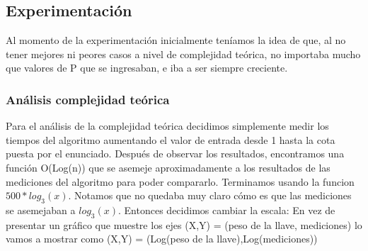 \documentclass[spanish,12pt]{article}
\begin{document}
{%



\subsection{Experimentación}
 Al momento de la experimentación inicialmente teníamos la idea de que, al no tener mejores ni peores casos a nivel de complejidad teórica, no importaba mucho que valores de P que se ingresaban, e iba a ser siempre creciente.

\subsubsection{Análisis complejidad te\'orica}
 Para el análisis de la complejidad te\'orica decidimos simplemente medir los tiempos del algoritmo aumentando el valor de entrada desde 1 hasta la cota puesta por el enunciado.
  Después de observar los resultados, encontramos una función O(Log(n)) que se asemeje aproximadamente a los resultados de las mediciones del algoritmo para poder compararlo.
  Terminamos usando la funcion $500*log_3(x)$.
  Notamos que no quedaba muy claro cómo es que las mediciones se asemejaban a $log_3(x)$. Entonces decidimos cambiar la escala:
  En vez de presentar un gráfico que muestre los ejes (X,Y) = (peso de la llave, mediciones) lo vamos a mostrar como (X,Y) = (Log(peso de la llave),Log(mediciones))

}
\end{document}
